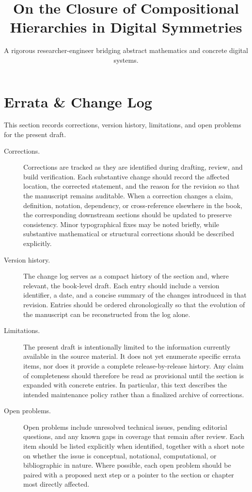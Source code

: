\documentclass[11pt]{article}
\title{On the Closure of Compositional Hierarchies in Digital Symmetries}
\author{A rigorous researcher-engineer bridging abstract mathematics and concrete digital systems.}
\begin{document}
\section*{Errata \& Change Log}

This section records corrections, version history, limitations, and open problems for the present draft.

\begin{description}
  \item[Corrections.] Corrections are tracked as they are identified during drafting, review, and build verification. Each substantive change should record the affected location, the corrected statement, and the reason for the revision so that the manuscript remains auditable. When a correction changes a claim, definition, notation, dependency, or cross-reference elsewhere in the book, the corresponding downstream sections should be updated to preserve consistency. Minor typographical fixes may be noted briefly, while substantive mathematical or structural corrections should be described explicitly.

  \item[Version history.] The change log serves as a compact history of the section and, where relevant, the book-level draft. Each entry should include a version identifier, a date, and a concise summary of the changes introduced in that revision. Entries should be ordered chronologically so that the evolution of the manuscript can be reconstructed from the log alone.

  \item[Limitations.] The present draft is intentionally limited to the information currently available in the source material. It does not yet enumerate specific errata items, nor does it provide a complete release-by-release history. Any claim of completeness should therefore be read as provisional until the section is expanded with concrete entries. In particular, this text describes the intended maintenance policy rather than a finalized archive of corrections.

  \item[Open problems.] Open problems include unresolved technical issues, pending editorial questions, and any known gaps in coverage that remain after review. Each item should be listed explicitly when identified, together with a short note on whether the issue is conceptual, notational, computational, or bibliographic in nature. Where possible, each open problem should be paired with a proposed next step or a pointer to the section or chapter most directly affected.
\end{description}
\end{document}
